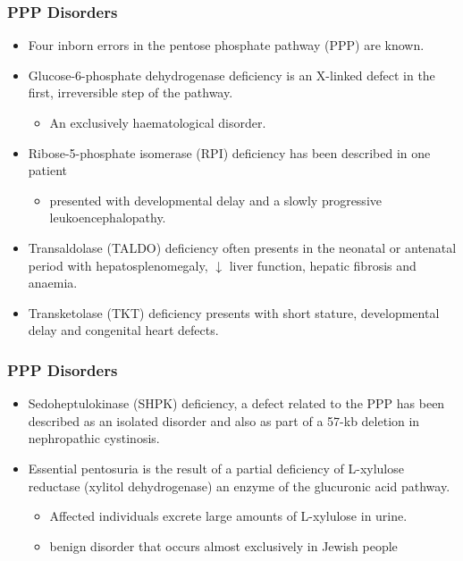 \documentclass{scrartcl}
\begin{document}
\subsubsection{PPP Disorders}
\label{sec:org60864ff}

\begin{itemize}
\item Four inborn errors in the pentose phosphate pathway (PPP) are known.
\item Glucose-6-phosphate dehydrogenase deficiency is an X-linked defect
in the first, irreversible step of the pathway.
\begin{itemize}
\item An exclusively haematological disorder.
\end{itemize}
\item Ribose-5-phosphate isomerase (RPI) deficiency has been described in one patient
\begin{itemize}
\item presented with developmental delay and a slowly progressive leukoencephalopathy.
\end{itemize}
\item Transaldolase (TALDO) deficiency often presents in the neonatal or
antenatal period with hepatosplenomegaly, \(\downarrow\) liver function,
hepatic fibrosis and anaemia.
\item Transketolase (TKT) deficiency presents with short stature,
developmental delay and congenital heart defects.
\end{itemize}

\subsubsection{PPP Disorders}
\label{sec:org029142a}
\begin{itemize}
\item Sedoheptulokinase (SHPK) deficiency, a defect related to the PPP has
been described as an isolated disorder and also as part of a 57-kb
deletion in nephropathic cystinosis.
\item Essential pentosuria is the result of a partial deficiency of L-xylulose reductase (xylitol dehydrogenase) an enzyme of the glucuronic acid pathway.
\begin{itemize}
\item Affected individuals excrete large amounts of L-xylulose in urine.
\item benign disorder that occurs almost exclusively in Jewish people
\end{itemize}
\end{itemize}
\end{document}
